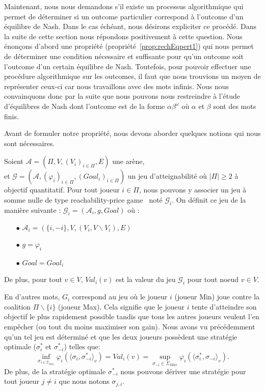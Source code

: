 Maintenant, nous nous demandons s'il existe un processus algorithmique qui permet de déterminer si un outcome particulier correspond à l'outcome d'un équilibre de Nash. Dans le cas échéant, nous désirons expliciter ce procédé. Dans la suite de cette section nous répondons positivement à cette question. Nous énonçons d'abord une propriété (propriété~\ref{prop:rechEqpert1}) qui nous permet de déterminer une condition nécessaire et suffisante pour qu'un outcome soit l'outcome d'un certain équilibre de Nash. Toutefois, pour pouvoir effectuer une procédure algorithmique sur les outcomes, il faut que nous trouvions un moyen de représenter ceux-ci car nous travaillons avec des mots infinis. Nous nous convainquons donc par la suite que nous pouvons nous restreindre à l'étude d'équilibres de Nash dont l'outcome est de la forme $\alpha \beta^{\omega}$ où $\alpha$ et $\beta$ sont des mots finis. 

Avant de formuler notre propriété, nous devons aborder quelques notions qui nous sont nécessaires.


\begin{defi}
	\label{defi:coalGame}
 Soient $\mathcal{A} = (\Pi, V, (V_{i})_{i\in\Pi}, E)$ une arène,\\
et $\mathcal{G} = (\mathcal{A}, (\varphi _{i})_{i\in\Pi}, (Goal_{i})_{i\in\Pi})$ un jeu d'atteignabilité où $|\Pi| \geq 2$ à objectif quantitatif.
Pour tout joueur $i \in \Pi$, nous pouvons y associer un jeu à somme nulle de type \og reachability-price game \fg~noté $\mathcal{G}_{i}$.
On définit ce jeu de la manière suivante : 
$ \displaystyle \mathcal{G}_{i}= (\mathcal{A}_{i}, g , Goal) \text{ où }$:
\begin{itemize}
	\item[$\bullet$] $\mathcal{A}_{i} = (\{i,-i \}, V, (V_{i},V\backslash V_i),E)$
	\item[$\bullet$] $g = \varphi_i$ 
	\item[$\bullet$] $Goal = Goal_i$
\end{itemize}

\noindent De plus, pour tout $v\in V$, $Val_i(v)$ est la valeur du jeu $\mathcal{G}_i$ pour tout noeud $v\in V$. 
\end{defi} 

En d'autres mots, $G_i$ correspond au jeu où le joueur $i$ (joueur Min) joue contre la coalition $\Pi\backslash\{ i \}$ (joueur Max). Cela signifie que le joueur $i$ tente d'atteindre son objectif le plus rapidement possible tandis que tous les autres joueurs veulent l'en empêcher (ou tout du moins maximiser son gain). Nous avons vu précédemment qu'un tel jeu est déterminé et que les deux joueurs possèdent une stratégie optimale ($\sigma^*_i$ et $\sigma^*_{-i}$) telles que:
$$ \inf_{\sigma _{i\in \Sigma _{Min}}} \varphi_i(\langle \sigma_i,\sigma^*_{-i}\rangle_v)= Val_i(v) = \sup _{\sigma_{-i}\in \Sigma_{Max}} \varphi_i(\langle \sigma^*_i, \sigma_{-i}\rangle_v).$$ De plus, de la stratégie optimale $\sigma^*_{-i}$ nous pouvons dériver une stratégie pour tout joueur $j \neq i$ que nous notons $\sigma_{j,i}$.\\

